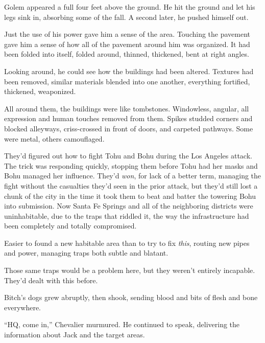 \blacksquare



Golem appeared a full four feet above the ground.  He hit the ground and let his legs sink in, absorbing some of the fall.  A second later, he pushed himself out.



Just the use of his power gave him a sense of the area.  Touching the pavement gave him a sense of how all of the pavement around him was organized.  It had been folded into itself, folded around, thinned, thickened, bent at right angles.



Looking around, he could see how the buildings had been altered.  Textures had been removed, similar materials blended into one another, everything fortified, thickened, weaponized.



All around them, the buildings were like tombstones.  Windowless, angular, all expression and human touches removed from them.  Spikes studded corners and blocked alleyways, criss-crossed in front of doors, and carpeted pathways.  Some were metal, others camouflaged.



They'd figured out how to fight Tohu and Bohu during the Los Angeles attack.  The trick was responding quickly, stopping them before Tohu had her masks and Bohu managed her influence.  They'd \emph{won}, for lack of a better term, managing the fight without the casualties they'd seen in the prior attack, but they'd still lost a chunk of the city in the time it took them to beat and batter the towering Bohu into submission.  Now Santa Fe Springs and all of the neighboring districts were uninhabitable, due to the traps that riddled it, the way the infrastructure had been completely and totally compromised.



Easier to found a new habitable area than to try to fix \emph{this}, routing new pipes and power, managing traps both subtle and blatant.



Those same traps would be a problem here, but they weren't entirely incapable.  They'd dealt with this before.



Bitch's dogs grew abruptly, then shook, sending blood and bits of flesh and bone everywhere.



``HQ, come in,'' Chevalier murmured.  He continued to speak, delivering the information about Jack and the target areas.



